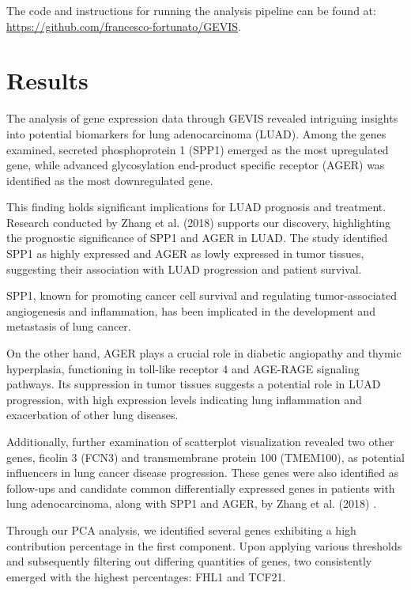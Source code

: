 \documentclass[
	a4paper, %
	10pt, %
	unnumberedsections, %
	twoside, %
]{LTJournalArticle}
\begin{document}
The code and instructions for running the analysis pipeline can be found at: \url{https://github.com/francesco-fortunato/GEVIS}.

\section{Results}

The analysis of gene expression data through GEVIS revealed intriguing insights into potential biomarkers for lung adenocarcinoma (LUAD). Among the genes examined, secreted phosphoprotein 1 (SPP1) emerged as the most upregulated gene, while advanced glycosylation end-product specific receptor (AGER) was identified as the most downregulated gene.

This finding holds significant implications for LUAD prognosis and treatment. Research conducted by Zhang et al. (2018) \autocite{Zhang:spp1} supports our discovery, highlighting the prognostic significance of SPP1 and AGER in LUAD. The study identified SPP1 as highly expressed and AGER as lowly expressed in tumor tissues, suggesting their association with LUAD progression and patient survival.

SPP1, known for promoting cancer cell survival and regulating tumor-associated angiogenesis and inflammation, has been implicated in the development and metastasis of lung cancer.

On the other hand, AGER plays a crucial role in diabetic angiopathy and thymic hyperplasia, functioning in toll-like receptor 4 and AGE-RAGE signaling pathways. Its suppression in tumor tissues suggests a potential role in LUAD progression, with high expression levels indicating lung inflammation and exacerbation of other lung diseases. 

Additionally, further examination of scatterplot visualization revealed two other genes, ficolin 3 (FCN3) and transmembrane protein 100 (TMEM100), as potential influencers in lung cancer disease progression. These genes were also identified as follow-ups and candidate common differentially expressed genes in patients with lung adenocarcinoma, along with SPP1 and AGER, by Zhang et al. (2018) \autocite{Zhang:spp1}.

Through our PCA analysis, we identified several genes exhibiting a high contribution percentage in the first component. Upon applying various thresholds and subsequently filtering out differing quantities of genes, two consistently emerged with the highest percentages: FHL1 and TCF21.
\end{document}
